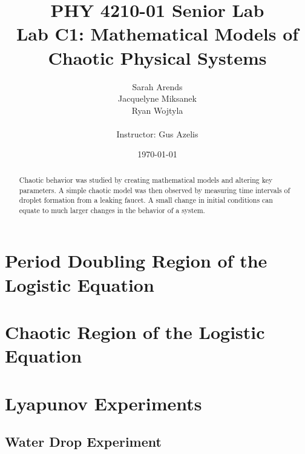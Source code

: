 \documentclass[a4paper]{article}
\title{PHY 4210-01 Senior Lab \\Lab C1:  Mathematical Models of Chaotic Physical Systems }
\author{Sarah Arends \\
        Jacquelyne Miksanek \\
        Ryan Wojtyla \\ \\
        Instructor: Gus Azelis}
\date{\today}
\begin{document}
\maketitle

\begin{abstract}
\qq Chaotic behavior was studied by creating mathematical models and altering key parameters. A simple chaotic model was then observed by measuring time intervals of droplet formation from a leaking faucet. A small change in initial conditions can equate to much larger changes in the behavior of a system.

\end{abstract}

\newpage

\tableofcontents

\newpage

\section{Period Doubling Region of the Logistic Equation}

\section{Chaotic Region of the Logistic Equation}

\section{Lyapunov Experiments}

\subsection{Water Drop Experiment}
\end{document}

